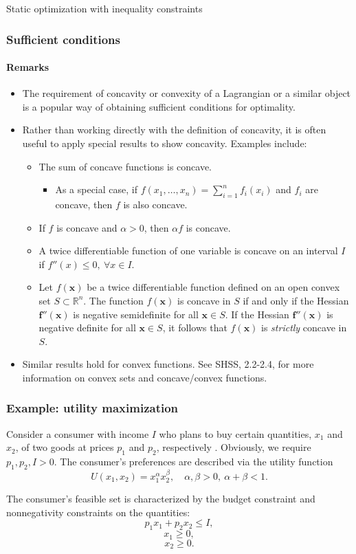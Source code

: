 \documentclass[10pt]{beamer}
\theoremstyle{definition}
\begin{document}
\begin{section}{Static optimization with inequality constraints}
\begin{frame}[fragile]
\frametitle{Sufficient conditions}
\framesubtitle{Remarks}
\begin{itemize}
\item The requirement of concavity or convexity of a Lagrangian or a similar object is a popular way of obtaining sufficient conditions for optimality.
\item Rather than working directly with the definition of concavity, it is often useful to apply special results to show concavity. Examples include:
\begin{itemize}
\item The sum of concave functions is concave.
\begin{itemize}
\item As a special case, if $ f(x_1,\ldots,x_n)=\sum_{i=1}^{n}f_i(x_i) $ and $ f_i $ are concave, then $ f $ is also concave.
\end{itemize}
\item If $ f $ is concave and $ \alpha>0 $, then $ \alpha f $ is concave.
\item A twice differentiable function of one variable is concave on an interval $ I $ if $ f''(x)\leq 0, ~\forall x \in I $.
\item Let $ f(\mathbf{x}) $ be a twice differentiable function defined on an open convex set $ S\subset \mathbb{R}^n $. The function $ f(\mathbf{x}) $ is concave in $ S $ if and only if the Hessian $ \mathbf{f''(x)} $ is negative semidefinite for all $ \mathbf{x}\in S $. If the Hessian $ \mathbf{f''(x)} $ is negative definite for all $ \mathbf{x}\in S $, it follows that $ f(\mathbf{x}) $ is \emph{strictly} concave in $ S $.
\end{itemize}
\item Similar results hold for convex functions. See SHSS, 2.2-2.4, for more information on convex sets and concave/convex functions.
\end{itemize}
\end{frame}

\begin{frame}[fragile]
\frametitle{Example: utility maximization}
Consider a consumer with income $ I $ who plans to buy certain quantities, $ x_1 $ and $ x_2 $, of two goods at prices $ p_1 $ and $ p_2 $, respectively . Obviously, we require $ p_1,p_2,I >0 $. The consumer's preferences are described via the utility function \[ U(x_1,x_2) = x_1^\alpha x_2^\beta,\quad \alpha,\beta >0,~\alpha+\beta < 1. \] 

The consumer's feasible set is characterized by the budget constraint and nonnegativity constraints on the quantities:   \[ p_1 x_1 + p_2 x_2 \leq I , \]  
\[ x_1\geq 0 , \] \[ x_2 \geq 0. \] 


\end{frame}
\end{section}
\end{document}
